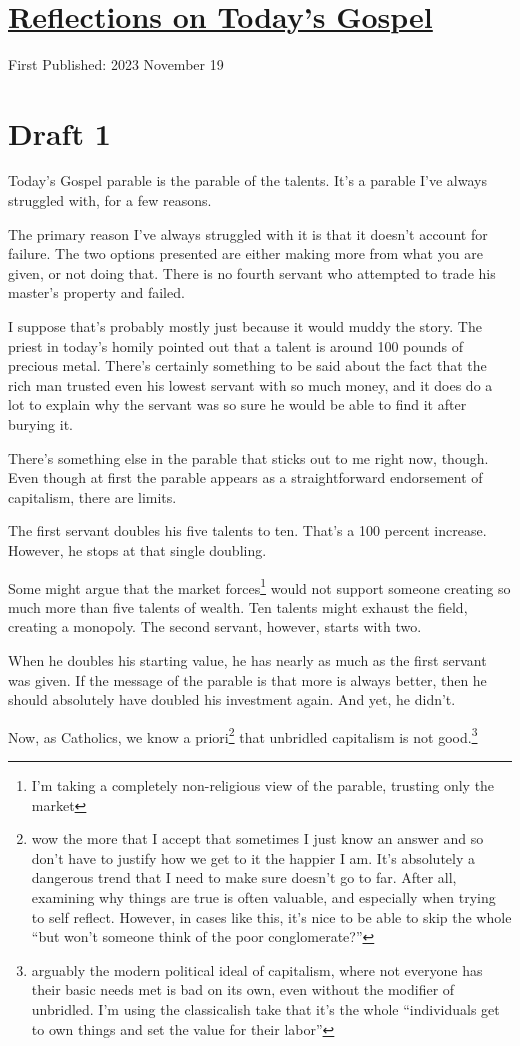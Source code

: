 \documentclass[12pt]{article}[titlepage]
\newcommand{\say}[1]{``#1''}
\newcommand{\1}{\={a}}
\newcommand{\2}{\={e}}
\newcommand{\3}{\={\i}}
\newcommand{\4}{\=o}
\newcommand{\5}{\=u}
\newcommand{\6}{\={A}}
\renewcommand{\,}{\textsuperscript{,}}
\begin{document}

\doublespacing
\section{\href{reflections-on-readings-33-ordinary-b.html}{Reflections on Today's Gospel}}
First Published: 2023 November 19

\section{Draft 1}
Today's Gospel parable is the parable of the talents.
It's a parable I've always struggled with, for a few reasons.

The primary reason I've always struggled with it is that it doesn't account for failure.
The two options presented are either making more from what you are given, or not doing that.
There is no fourth servant who attempted to trade his master's property and failed.

I suppose that's probably mostly just because it would muddy the story.
The priest in today's homily pointed out that a talent is around 100 pounds of precious metal.
There's certainly something to be said about the fact that the rich man trusted even his lowest servant with so much money, and it does do a lot to explain why the servant was so sure he would be able to find it after burying it.

There's something else in the parable that sticks out to me right now, though.
Even though at first the parable appears as a straightforward endorsement of capitalism, there are limits.

The first servant doubles his five talents to ten.
That's a 100 percent increase.
However, he stops at that single doubling.

Some might argue that the market forces\footnote{I'm taking a completely non-religious view of the parable, trusting only the market} would not support someone creating so much more than five talents of wealth.
Ten talents might exhaust the field, creating a monopoly.
The second servant, however, starts with two.

When he doubles his starting value, he has nearly as much as the first servant was given.
If the message of the parable is that more is always better, then he should absolutely have doubled his investment again.
And yet, he didn't.

Now, as Catholics, we know a priori\footnote{wow the more that I accept that sometimes I just know an answer and so don't have to justify how we get to it the happier I am.
It's absolutely a dangerous trend that I need to make sure doesn't go to far.
After all, examining why things are true is often valuable, and especially when trying to self reflect.
However, in cases like this, it's nice to be able to skip the whole \say{but won't someone think of the poor conglomerate?}}
that unbridled capitalism is not good.\footnote{arguably the modern political ideal of capitalism, where not everyone has their basic needs met is bad on its own, even without the modifier of unbridled.
I'm using the classicalish take that it's the whole \say{individuals get to own things and set the value for their labor}}
\end{document}

